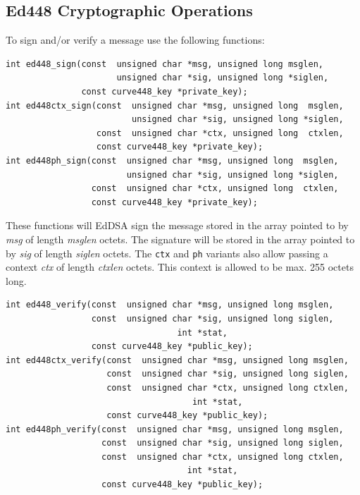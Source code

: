 \documentclass[synpaper]{book}
\begin{document}
\subsection{Ed448 Cryptographic Operations}

To sign and/or verify a message use the following functions:

\begin{verbatim}
int ed448_sign(const  unsigned char *msg, unsigned long msglen,
                      unsigned char *sig, unsigned long *siglen,
               const curve448_key *private_key);
int ed448ctx_sign(const  unsigned char *msg, unsigned long  msglen,
                         unsigned char *sig, unsigned long *siglen,
                  const  unsigned char *ctx, unsigned long  ctxlen,
                  const curve448_key *private_key);
int ed448ph_sign(const  unsigned char *msg, unsigned long  msglen,
                        unsigned char *sig, unsigned long *siglen,
                 const  unsigned char *ctx, unsigned long  ctxlen,
                 const curve448_key *private_key);
\end{verbatim}

These functions will EdDSA sign the message stored in the array pointed to by \textit{msg} of length \textit{msglen} octets.  The signature
will be stored in the array pointed to by \textit{sig} of length \textit{siglen} octets.  The \texttt{ctx} and \texttt{ph} variants also
allow passing a context \textit{ctx} of length \textit{ctxlen} octets.  This context is allowed to be max. 255 octets long.

\begin{verbatim}
int ed448_verify(const  unsigned char *msg, unsigned long msglen,
                 const  unsigned char *sig, unsigned long siglen,
                                  int *stat,
                 const curve448_key *public_key);
int ed448ctx_verify(const  unsigned char *msg, unsigned long msglen,
                    const  unsigned char *sig, unsigned long siglen,
                    const  unsigned char *ctx, unsigned long ctxlen,
                                     int *stat,
                    const curve448_key *public_key);
int ed448ph_verify(const  unsigned char *msg, unsigned long msglen,
                   const  unsigned char *sig, unsigned long siglen,
                   const  unsigned char *ctx, unsigned long ctxlen,
                                    int *stat,
                   const curve448_key *public_key);
\end{verbatim}
\end{document}
